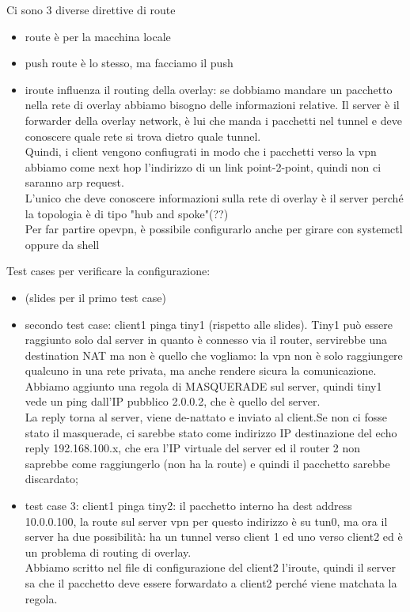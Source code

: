 \documentclass[12pt, oneside]{extbook} %
\begin{document}
Ci sono 3 diverse direttive di route
\begin{itemize}
\item route è per la macchina locale
\item push route è lo stesso, ma facciamo il push
\item iroute influenza il routing della overlay: se dobbiamo mandare un pacchetto nella rete di overlay abbiamo bisogno delle informazioni relative. Il server è il forwarder della overlay network, è lui che manda i pacchetti nel tunnel e deve conoscere quale rete si trova dietro quale tunnel.\\Quindi, i client vengono confiugrati in modo che i pacchetti verso la vpn abbiamo come next hop l'indirizzo di un link point-2-point, quindi non ci saranno arp request.\\L'unico che deve conoscere informazioni sulla rete di overlay è il server perché la topologia è di tipo "hub and spoke"(??)\\Per far partire opevpn, è possibile configurarlo anche per girare con systemctl oppure da shell
\end{itemize}
Test cases per verificare la configurazione:
\begin{itemize}
\item (slides per il primo test case)
\item secondo test case: client1 pinga tiny1 (rispetto alle slides). Tiny1 può essere raggiunto solo dal server in quanto è connesso via il router, servirebbe una destination NAT ma non è quello che vogliamo: la vpn non è solo raggiungere qualcuno in una rete privata, ma anche rendere sicura la comunicazione. Abbiamo aggiunto una regola di MASQUERADE sul server, quindi tiny1 vede un ping dall'IP pubblico 2.0.0.2, che è quello del server.\\La reply torna al server, viene de-nattato e inviato al client.Se non ci fosse stato il masquerade, ci sarebbe stato come indirizzo IP destinazione del echo reply 192.168.100.x, che era l'IP virtuale del server ed il router 2 non saprebbe come raggiungerlo (non ha la route) e quindi il pacchetto sarebbe discardato;
\item test case 3: client1 pinga tiny2: il pacchetto interno ha dest address 10.0.0.100, la route sul server vpn per questo indirizzo è su tun0, ma ora il server ha due possibilità: ha un tunnel verso client 1 ed uno verso client2 ed è un problema di routing di overlay.\\Abbiamo scritto nel file di configurazione del client2 l'iroute, quindi il server sa che il pacchetto deve essere forwardato a client2 perché viene matchata la regola.
\end{itemize}
\end{document}
